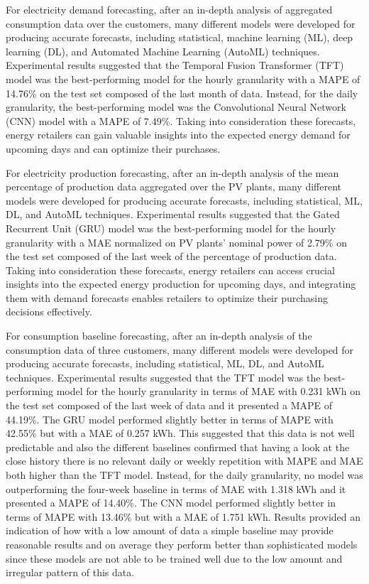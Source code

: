 For electricity demand forecasting, after an in-depth analysis of aggregated consumption data over the customers, many different models were developed for producing accurate forecasts, including statistical, machine learning (ML), deep learning (DL), and Automated Machine Learning (AutoML) techniques.
Experimental results suggested that the Temporal Fusion Transformer (TFT) model was the best-performing model for the hourly granularity with a MAPE of 14.76\% on the test set composed of the last month of data.
Instead, for the daily granularity, the best-performing model was the Convolutional Neural Network (CNN) model with a MAPE of 7.49\%.
Taking into consideration these forecasts, energy retailers can gain valuable insights into the expected energy demand for upcoming days and can optimize their purchases.

For electricity production forecasting, after an in-depth analysis of the mean percentage of production data aggregated over the PV plants, many different models were developed for producing accurate forecasts, including statistical, ML, DL, and AutoML techniques.
Experimental results suggested that the Gated Recurrent Unit (GRU) model was the best-performing model for the hourly granularity with a MAE normalized on PV plants' nominal power of 2.79\% on the test set composed of the last week of the percentage of production data.
Taking into consideration these forecasts, energy retailers can access crucial insights into the expected energy production for upcoming days, and integrating them with demand forecasts enables retailers to optimize their purchasing decisions effectively.

For consumption baseline forecasting, after an in-depth analysis of the consumption data of three customers, many different models were developed for producing accurate forecasts, including statistical, ML, DL, and AutoML techniques.
Experimental results suggested that the TFT model was the best-performing model for the hourly granularity in terms of MAE with 0.231 kWh on the test set composed of the last week of data and it presented a MAPE of 44.19\%.
The GRU model performed slightly better in terms of MAPE with 42.55\% but with a MAE of 0.257 kWh.
This suggested that this data is not well predictable and also the different baselines confirmed that having a look at the close history there is no relevant daily or weekly repetition with MAPE and MAE both higher than the TFT model.
Instead, for the daily granularity, no model was outperforming the four-week baseline in terms of MAE with 1.318 kWh and it presented a MAPE of 14.40\%.
The CNN model performed slightly better in terms of MAPE with 13.46\% but with a MAE of 1.751 kWh.
Results provided an indication of how with a low amount of data a simple baseline may provide reasonable results and on average they perform better than sophisticated models since these models are not able to be trained well due to the low amount and irregular pattern of this data.

